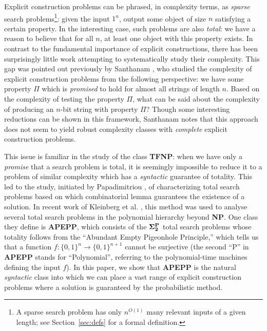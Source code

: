 \documentclass[11pt]{article}
\def\cl{\bf}
\begin{document}
Explicit construction problems can be phrased, in complexity terms, as \emph{sparse} search problems\footnote{A sparse search problem has only $n^{O(1)}$ many relevant inputs of a given length; see Section~\ref{sec:defs} for a formal definition.}: given the input $1^n$, output some object of size $n$ satisfying a certain property. In the interesting case, such problems are also \emph{total}: we have a reason to believe that for all $n$, at least one object with this property exists. In contrast to the fundamental importance of explicit constructions, there has been surprisingly little work attempting to systematically study their complexity. This gap was pointed out previously by Santhanam \cite{explicit-constructions}, who studied the complexity of explicit construction problems from the following perspective: we have some property $\Pi$ which is \emph{promised} to hold for almost all strings of length $n$. Based on the complexity of testing the property $\Pi$, what can be said about the complexity of producing an $n$-bit string with property $\Pi$? Though some interesting reductions can be shown in this framework, Santhanam notes that this approach does not seem to yield robust complexity classes with \emph{complete} explicit construction problems.

This issue is familiar in the study of the class {\cl TFNP}: when we have only a \emph{promise} that a search problem is total, it is seemingly impossible to reduce it to a problem of similar complexity which has a \emph{syntactic} guarantee of totality. This led to the study, initiated by Papadimitriou \cite{christos}, of characterizing total search problems based on which combinatorial lemma guarantees the existence of a solution. In recent work of Kleinberg et al. \cite{total}, this method was used to analyse several total search problems in the polynomial hierarchy beyond {\cl NP}. One class they define is {\cl APEPP}, which consists of the ${\cl \Sigma_2^P}$ total search problems whose totality follows from the ``Abundant Empty Pigeonhole Principle,'' which tells us that a function $f: \{0,1\}^n \rightarrow \{0,1\}^{n+1}$ cannot be surjective (the second ``P'' in {\cl APEPP} stands for ``Polynomial'', referring to the polynomial-time machines defining the input $f$). In this paper, we show that {\cl APEPP} is the natural \emph{syntactic} class into which we can place a vast range of explicit construction problems where a solution is guaranteed by the probabilistic method.
\end{document}

